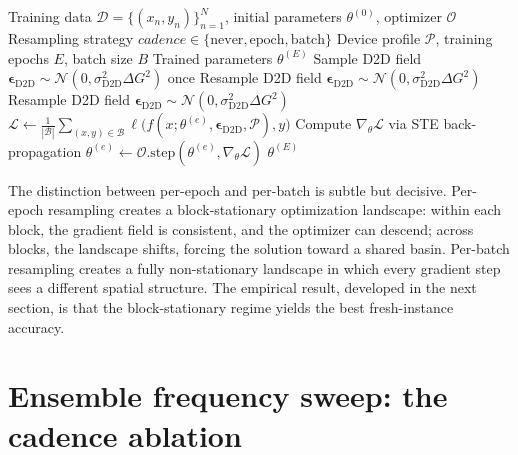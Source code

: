 \begin{algorithm}[t]
\caption{HAT training loop (unified over the three resampling cadences)}
\label{alg:hat-training}
\begin{algorithmic}[1]
\Require Training data $\mathcal{D}=\{(x_n,y_n)\}_{n=1}^{N}$, initial parameters $\theta^{(0)}$, optimizer $\mathcal{O}$
\Require Resampling strategy $\mathit{cadence} \in \{\text{never}, \text{epoch}, \text{batch}\}$
\Require Device profile $\mathcal{P}$, training epochs $E$, batch size $B$
\Ensure Trained parameters $\theta^{(E)}$
    \State Sample D2D field $\boldsymbol{\epsilon}_{\text{D2D}} \sim \mathcal{N}(0, \sigma_{\text{D2D}}^{2} \Delta G^{2})$ once 
\EndIf
{} 
        \State Resample D2D field $\boldsymbol{\epsilon}_{\text{D2D}} \sim \mathcal{N}(0, \sigma_{\text{D2D}}^{2} \Delta G^{2})$  \label{line:d2d-sample}
    \EndIf
            \State Resample D2D field $\boldsymbol{\epsilon}_{\text{D2D}} \sim \mathcal{N}(0, \sigma_{\text{D2D}}^{2} \Delta G^{2})$ 
        \EndIf
        \State $\mathcal{L} \gets \frac{1}{|\mathcal{B}|} \sum_{(x,y) \in \mathcal{B}} \ell\bigl(f(x; \theta^{(e)}, \boldsymbol{\epsilon}_{\text{D2D}}, \mathcal{P}), y\bigr)$
        \State Compute $\nabla_{\theta} \mathcal{L}$ via STE back-propagation
        \State $\theta^{(e)} \gets \mathcal{O}.\text{step}(\theta^{(e)}, \nabla_{\theta} \mathcal{L})$
    \EndFor
\EndFor
\State \Return $\theta^{(E)}$
\end{algorithmic}
\end{algorithm}

The distinction between per-epoch and per-batch is subtle but decisive. Per-epoch resampling creates a block-stationary optimization landscape: within each block, the gradient field is consistent, and the optimizer can descend; across blocks, the landscape shifts, forcing the solution toward a shared basin. Per-batch resampling creates a fully non-stationary landscape in which every gradient step sees a different spatial structure. The empirical result, developed in the next section, is that the block-stationary regime yields the best fresh-instance accuracy.

\section{Ensemble frequency sweep: the cadence ablation}
\label{sec:frequency-sweep}

